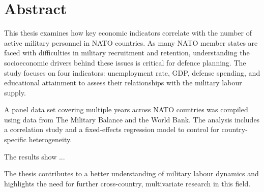 \chapter{Abstract}

This thesis examines how key economic indicators correlate with the number of active military personnel in NATO countries. As many NATO member states are faced
with difficulties in military recruitment and retention, understanding the socioeconomic
drivers behind these issues is critical for defence planning. 
The study focuses on four indicators: unemployment rate, GDP, defense spending, 
and educational attainment to assess their relationships with the military labour supply.

A panel data set covering multiple years across NATO countries was compiled using
data from The Military Balance and the World Bank. 
The analysis includes a correlation study and a 
fixed-effects regression model to control for country-specific heterogeneity.

The results show ...

The thesis contributes to a better understanding of military labour dynamics 
and highlights the need for further cross-country, 
multivariate research in this field.